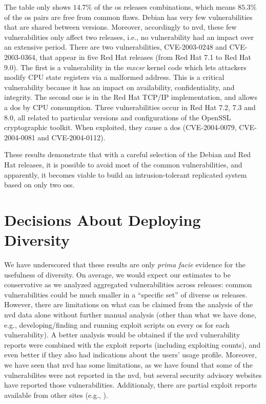 The table only shows $14.7\%$ of the \gls{os} releases combinations, which means $85.3\%$ of the \gls{os} pairs are free from common flaws. 
Debian has very few vulnerabilities that are shared between versions. 
Moreover, accordingly to \gls{nvd}, these few vulnerabilities only affect two releases, i.e., no vulnerability had an impact over an extensive period. 
There are two vulnerabilities, CVE-2003-0248 and CVE-2003-0364, that appear in five Red Hat releases (from Red Hat 7.1 to Red Hat 9.0). 
The first is a vulnerability in the \emph{mxcsr} kernel code which lets attackers modify CPU state registers via a malformed address. 
This is a critical vulnerability because it has an impact on availability, confidentiality, and integrity. 
The second one is in the Red Hat TCP/IP implementation, and allows a \gls{dos} by CPU consumption. 
Three vulnerabilities occur in Red Hat 7.2, 7.3 and 8.0, all related to particular versions and configurations of the OpenSSL cryptographic toolkit. 
When exploited, they cause a \gls{dos} (CVE-2004-0079, CVE-2004-0081 and CVE-2004-0112).

These results demonstrate that with a careful selection of the Debian and Red Hat releases, it is possible to avoid most of the common vulnerabilities, and apparently, it becomes viable to build an intrusion-tolerant replicated system based on only two \glspl{os}.


\section{Decisions About Deploying Diversity}\label{decisions}
We have underscored that these results are only \textit{prima facie} evidence for the usefulness of diversity. 
On average, we would expect our estimates to be conservative as we analyzed aggregated vulnerabilities across releases: common vulnerabilities could be much smaller in a ``specific set'' of diverse \gls{os} releases. 
However, there are limitations on what can be claimed from the analysis of the \gls{nvd} data alone without further manual analysis (other than what we have done, e.g., developing/finding and running exploit scripts on every \gls{os} for each vulnerability).
A better analysis would be obtained if the \gls{nvd} vulnerability reports were combined with the exploit reports (including exploiting counts), and even better if they also had indications about the users' usage profile.
Moreover, we have seen that \gls{nvd} has some limitations, as we have found that some of the vulnerabilites were not reported in the \gls{nvd}, but several security advisory websites have reported those vulnerabilities.
Additionaly, there are partial exploit reports available from other sites (e.g., \cite{cvedetails}).


